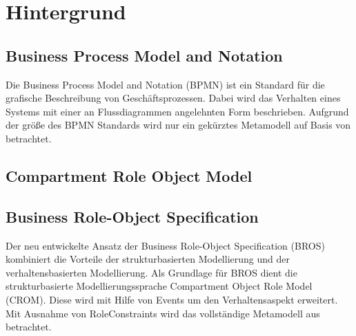 \chapter{Hintergrund}

\section{Business Process Model and Notation}

Die Business Process Model and Notation (BPMN) ist ein Standard für die grafische Beschreibung von Geschäftsprozessen.
Dabei wird das Verhalten eines Systems mit einer an Flussdiagrammen angelehnten Form beschrieben.
Aufgrund der größe des BPMN Standards wird nur ein gekürztes Metamodell auf Basis von \cite{Loja2010} betrachtet.

\section{Compartment Role Object Model}

\section{Business Role-Object Specification}

Der neu entwickelte Ansatz der Business Role-Object Specification (BROS) kombiniert die Vorteile der strukturbasierten Modellierung und der verhaltensbasierten Modellierung.
Als Grundlage für BROS dient die strukturbasierte Modellierungssprache Compartment Object Role Model (CROM).
Diese wird mit Hilfe von Events um den Verhaltensaspekt erweitert.
Mit Ausnahme von RoleConstraints wird das vollständige Metamodell aus \cite{Schoen} betrachtet.
